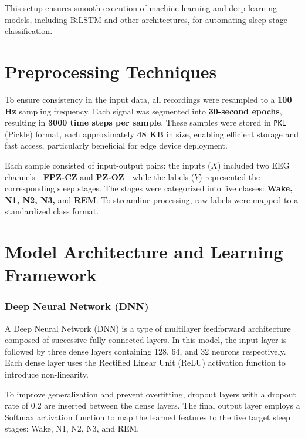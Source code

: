 This setup ensures smooth execution of machine learning and deep learning models, including BiLSTM and other architectures, for automating sleep stage classification.



\section{Preprocessing Techniques}

To ensure consistency in the input data, all recordings were resampled to a \textbf{100 Hz} sampling frequency. Each signal was segmented into \textbf{30-second epochs}, resulting in \textbf{3000 time steps per sample}. These samples were stored in \texttt{PKL} (Pickle) format, each approximately \textbf{48 KB} in size, enabling efficient storage and fast access, particularly beneficial for edge device deployment.

Each sample consisted of input-output pairs: the inputs ($X$) included two EEG channels—\textbf{FPZ-CZ} and \textbf{PZ-OZ}—while the labels ($Y$) represented the corresponding sleep stages. The stages were categorized into five classes: \textbf{Wake, N1, N2, N3,} and \textbf{REM}. To streamline processing, raw labels were mapped to a standardized class format.




\section{Model Architecture and Learning Framework}


\subsubsection{Deep Neural Network (DNN)}

A Deep Neural Network (DNN) is a type of multilayer feedforward architecture composed of successive fully connected layers. In this model, the input layer is followed by three dense layers containing 128, 64, and 32 neurons respectively. Each dense layer uses the Rectified Linear Unit (ReLU) activation function to introduce non-linearity.

To improve generalization and prevent overfitting, dropout layers with a dropout rate of 0.2 are inserted between the dense layers. The final output layer employs a Softmax activation function to map the learned features to the five target sleep stages: Wake, N1, N2, N3, and REM.

